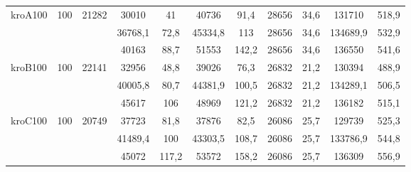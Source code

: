 \begin{adjustwidth}{-1in}{-1in}
\begin{center}
\begin{tabular}{lcccccccccc}
\midrule
\multirow{3}{*}{kroA100} & \multirow{3}{*}{100} & \multirow{3}{*}{21282} & 30010 & 41  & 40736 & 91,4  & 28656 & 34,6  & 131710 & 518,9 \\
 & &  & 36768,1 & 72,8  & 45334,8 & 113  & 28656 & 34,6  & 134689,9 & 532,9 \\
 & &  & 40163 & 88,7  & 51553 & 142,2  & 28656 & 34,6  & 136550 & 541,6 \\
\midrule
\multirow{3}{*}{kroB100} & \multirow{3}{*}{100} & \multirow{3}{*}{22141} & 32956 & 48,8  & 39026 & 76,3  & 26832 & 21,2  & 130394 & 488,9 \\
 & &  & 40005,8 & 80,7  & 44381,9 & 100,5  & 26832 & 21,2  & 134289,1 & 506,5 \\
 & &  & 45617 & 106  & 48969 & 121,2  & 26832 & 21,2  & 136182 & 515,1 \\
\midrule
\multirow{3}{*}{kroC100} & \multirow{3}{*}{100} & \multirow{3}{*}{20749} & 37723 & 81,8  & 37876 & 82,5  & 26086 & 25,7  & 129739 & 525,3 \\
 & &  & 41489,4 & 100  & 43303,5 & 108,7  & 26086 & 25,7  & 133786,9 & 544,8 \\
 & &  & 45072 & 117,2  & 53572 & 158,2  & 26086 & 25,7  & 136309 & 556,9 \\
\bottomrule

\end{tabular}


\begin{tabular}{lcccccccccc}


\end{tabular}
\end{center}
\end{adjustwidth}
